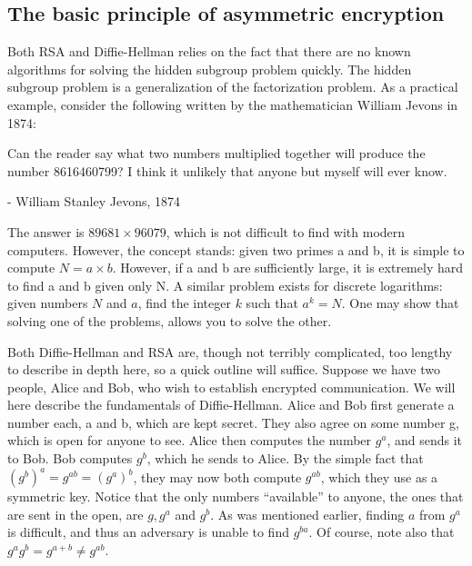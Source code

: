 \documentclass[conference]{IEEEtran}
\begin{document}
\subsection{The basic principle of asymmetric encryption}
Both RSA and Diffie-Hellman relies on the fact that there are no known algorithms for solving the hidden subgroup problem quickly.
The hidden subgroup problem is a generalization of the factorization problem.
As a practical example, consider the following written by the mathematician William Jevons in 1874:
\begin{quoting}
Can the reader say what two numbers multiplied together will produce the number 8616460799? I think it unlikely that anyone but myself will ever know.
 
- William Stanley Jevons, 1874
\end{quoting}
The answer is $89681 \times 96079$, which is not difficult to find with modern computers.
However, the concept stands: given two primes a and b, it is simple to compute $N = a \times b$.
However, if a and b are sufficiently large, it is extremely hard to find a and b given only N.
A similar problem exists for discrete logarithms: given numbers $N$ and $a$, find the integer $k$ such that $a^k = N$.
One may show that solving one of the problems, allows you to solve the other.

Both Diffie-Hellman and RSA are, though not terribly complicated, too lengthy to describe in depth here, so a quick outline will suffice.
Suppose we have two people, Alice and Bob, who wish to establish encrypted communication.
We will here describe the fundamentals of Diffie-Hellman.
Alice and Bob first generate a number each, a and b, which are kept secret.
They also agree on some number g, which is open for anyone to see.
Alice then computes the number $g^a$, and sends it to Bob.
Bob computes $g^b$, which he sends to Alice.
By the simple fact that $(g^b)^a = g^{ab} = (g^a)^b$, they may now both compute $g^{ab}$, which they use as a symmetric key.
Notice that the only numbers ``available'' to anyone, the ones that are sent in the open, are $g, g^a$ and $g^b$.
As was mentioned earlier, finding $a$ from $g^a$ is difficult, and thus an adversary is unable to find $g^{ba}$.
Of course, note also that $g^a g^b = g^{a+b}\neq g^{ab}$.

\end{document}
